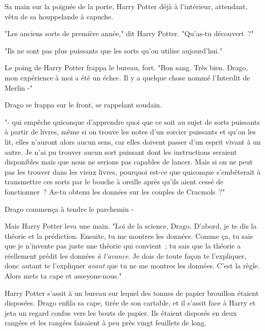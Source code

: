 Sa main sur la poignée de la porte, Harry Potter déjà à l'intérieur, attendant, vêtu de sa houppelande à capuche.

"Les anciens sorts de première année," dit Harry Potter. "Qu'as-tu découvert~?"

"Ils ne sont pas plus puissants que les sorts qu'on utilise aujourd'hui."

Le poing de Harry Potter frappa le bureau, fort. "Bon sang. Très bien. Drago, mon expérience à moi a été un échec. Il y a quelque chose nommé l'Interdit de Merlin -"

Drago se frappa sur le front, se rappelant soudain.

"- qui empêche quiconque d'apprendre quoi que ce soit au sujet de sorts puissants à partir de livres, même si on trouve les notes d'un sorcier puissants et qu'on les lit, elles n'auront alors aucun sens, car elles doivent passer d'un esprit vivant à un autre. Je n'ai pu trouver aucun sort puissant dont les instructions seraient disponibles mais que nous ne serions pas capables de lancer. Mais si on ne peut pas les trouver dans les vieux livres, pourquoi est-ce que quiconque s'embêterait à transmettre ces sorts par le bouche à oreille après qu'ils aient cessé de fonctionner~? As-tu obtenu les données sur les couples de Cracmols~?"

Drago commença à tendre le parchemin -

Mais Harry Potter leva une main. "Loi de la science, Drago. D'abord, je te dis la théorie et la prédiction. Ensuite, tu me montres les données. Comme ça, tu sais que je n'invente pas juste une théorie qui convient~; tu sais que la théorie a réellement prédit les données \emph{à l'avance}. Je dois de toute façon te l'expliquer, donc autant te l'expliquer \emph{avant} que tu ne me montres les données. C'est la règle. Alors mets ta cape et asseyons-nous."

Harry Potter s'assit à un bureau sur lequel des tonnes de papier brouillon étaient disposées. Drago enfila sa cape, tirée de son cartable, et il s'assit face à Harry et jeta un regard confus vers les bouts de papier. Ils étaient disposés en deux rangées et les rangées faisaient à peu près vingt feuillets de long.

